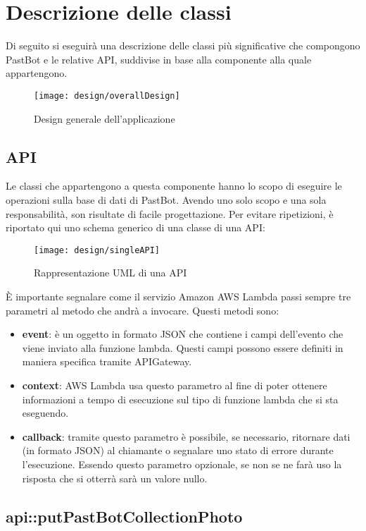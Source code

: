 \section{Descrizione delle classi}
Di seguito si eseguirà una descrizione delle classi più significative che
compongono PastBot e le relative API, suddivise in base alla componente alla
quale appartengono.

\begin{figure}[H]
  \centering
  \texttt{[image: design/overallDesign]}
  \caption{Design generale dell'applicazione}
\end{figure}

\subsection{API}

Le classi che appartengono a questa componente hanno lo scopo di eseguire le
operazioni sulla base di dati di PastBot. Avendo uno solo scopo e una sola
responsabilità, son risultate di facile progettazione.
Per evitare ripetizioni, è riportato qui uno schema generico di una classe
di una API:

\begin{figure}[H]
  \centering
  \texttt{[image: design/singleAPI]}
  \caption{Rappresentazione UML di una API}
\end{figure}

\label{design:api:params}
È importante segnalare come il servizio Amazon AWS Lambda passi sempre tre
parametri al metodo che andrà a invocare. Questi metodi sono:
\begin{itemize}
  \item \textbf{event}: è un oggetto in formato JSON che contiene i campi
dell'evento che viene inviato alla funzione lambda. Questi campi possono essere
definiti in maniera specifica tramite APIGateway.
  \item \textbf{context}: AWS Lambda usa questo parametro al fine di poter
ottenere informazioni a tempo di esecuzione sul tipo di funzione lambda che si
sta eseguendo.
  \item \textbf{callback}: tramite questo parametro è possibile, se necessario,
ritornare dati (in formato JSON) al chiamante o segnalare uno stato di errore
durante l'esecuzione. Essendo questo parametro opzionale, se non se ne farà uso
la risposta che si otterrà sarà un valore nullo.
\end{itemize}

\subsection{api::putPastBotCollectionPhoto}

